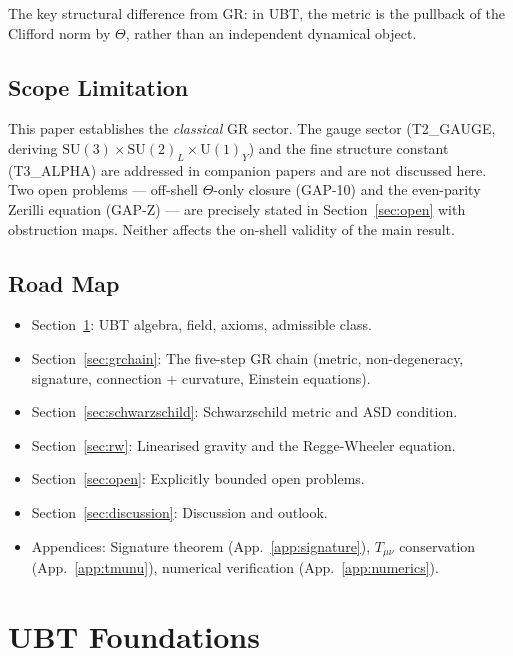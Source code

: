 \documentclass[12pt,a4paper]{article}
\theoremstyle{definition}
\theoremstyle{remark}
\newcommand{\Tmn}{T_{\mu\nu}}
\begin{document}
The key structural difference from GR: in UBT, the metric is the pullback of the
Clifford norm by $\Theta$, rather than an independent dynamical object.

\subsection{Scope Limitation}
\label{sec:scope}

This paper establishes the \emph{classical} GR sector.  The gauge sector (T2\_GAUGE,
deriving $\mathrm{SU}(3)\times\mathrm{SU}(2)_L\times\mathrm{U}(1)_Y$) and the fine
structure constant (T3\_ALPHA) are addressed in companion papers and are not
discussed here.  Two open problems --- off-shell $\Theta$-only closure (GAP-10) and
the even-parity Zerilli equation (GAP-Z) --- are precisely stated in
Section~\ref{sec:open} with obstruction maps.  Neither affects the on-shell validity
of the main result.

\subsection{Road Map}
\label{sec:roadmap}

\begin{itemize}[noitemsep]
  \item Section~\ref{sec:foundations}: UBT algebra, field, axioms, admissible class.
  \item Section~\ref{sec:grchain}: The five-step GR chain (metric, non-degeneracy,
    signature, connection + curvature, Einstein equations).
  \item Section~\ref{sec:schwarzschild}: Schwarzschild metric and ASD condition.
  \item Section~\ref{sec:rw}: Linearised gravity and the Regge-Wheeler equation.
  \item Section~\ref{sec:open}: Explicitly bounded open problems.
  \item Section~\ref{sec:discussion}: Discussion and outlook.
  \item Appendices: Signature theorem (App.~\ref{app:signature}),
    $\Tmn$ conservation (App.~\ref{app:tmunu}),
    numerical verification (App.~\ref{app:numerics}).
\end{itemize}

\section{UBT Foundations}
\label{sec:foundations}
\end{document}
